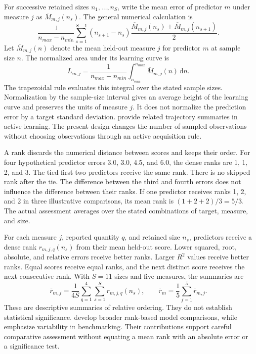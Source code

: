 For successive retained sizes \(n_1,\ldots,n_S\), write the mean error of predictor \(m\) under measure \(j\) as \(\overline M_{m,j}(n_s)\). The general numerical calculation is
\begin{equation}
\label{eq:icsor_learning_area_trapezoids}
\frac{1}{n_{max}-n_{min}}
\sum_{s=1}^{S-1}(n_{s+1}-n_s)
\frac{\overline M_{m,j}(n_s)+\overline M_{m,j}(n_{s+1})}{2}.
\end{equation}
Let \(\overline M_{m,j}(n)\) denote the mean held-out measure \(j\) for predictor \(m\) at sample size \(n\). The normalized area under its learning curve is
\begin{equation}
\label{eq:icsor_learning_area}
L_{m,j}=\frac{1}{n_{max}-n_{min}}
\int_{n_{min}}^{n_{max}}\overline M_{m,j}(n)\,\mathrm{d}n.
\end{equation}
The trapezoidal rule evaluates this integral over the stated sample sizes. Normalization by the sample-size interval gives an average height of the learning curve and preserves the units of measure \(j\). It does not normalize the prediction error by a target standard deviation. \citet{Cawley2011,Guyon2011} provide related trajectory summaries in active learning. The present design changes the number of sampled observations without choosing observations through an active acquisition rule.

A rank discards the numerical distance between scores and keeps their order. For four hypothetical predictor errors 3.0, 3.0, 4.5, and 6.0, the dense ranks are 1, 1, 2, and 3. The tied first two predictors receive the same rank. There is no skipped rank after the tie. The difference between the third and fourth errors does not influence the difference between their ranks. If one predictor receives ranks 1, 2, and 2 in three illustrative comparisons, its mean rank is \((1+2+2)/3=5/3\). The actual assessment averages over the stated combinations of target, measure, and size.

For each measure \(j\), reported quantity \(q\), and retained size \(n_s\), predictors receive a dense rank \(r_{m,j,q}(n_s)\) from their mean held-out score. Lower squared, root, absolute, and relative errors receive better ranks. Larger \(R^2\) values receive better ranks. Equal scores receive equal ranks, and the next distinct score receives the next consecutive rank. With \(S=11\) sizes and five measures, the summaries are
\begin{equation}
\label{eq:icsor_dense_rank}
\overline r_{m,j}=\frac{1}{4S}\sum_{q=1}^{4}\sum_{s=1}^{S}r_{m,j,q}(n_s),
\qquad
\overline r_m=\frac{1}{5}\sum_{j=1}^{5}\overline r_{m,j}.
\end{equation}
These are descriptive summaries of relative ordering. They do not establish statistical significance. \citet{Demsar2006} develop broader rank-based model comparisons, while \citet{Shevchenko2024} emphasize variability in benchmarking. Their contributions support careful comparative assessment without equating a mean rank with an absolute error or a significance test.

